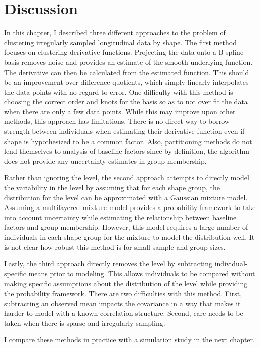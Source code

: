 \section{Discussion}
In this chapter, I described three different approaches to the problem of clustering irregularly sampled longitudinal data by shape. The first method focuses on clustering derivative functions. Projecting the data onto a B-spline basis removes noise and provides an estimate of the smooth underlying function. The derivative can then be calculated from the estimated function. This should be an improvement over difference quotients, which simply linearly interpolates the data points with no regard to error. One difficulty with this method is choosing the correct order and knots for the basis so as to not over fit the data when there are only a few data points. While this may improve upon other methods, this approach has limitations. There is no direct way to borrow strength between individuals when estimating their derivative function even if shape is hypothesized to be a common factor. Also, partitioning methods do not lend themselves to analysis of baseline factors since by definition, the algorithm does not provide any uncertainty estimates in group membership.  

Rather than ignoring the level, the second approach attempts to directly model the variability in the level by assuming that for each shape group, the distribution for the level can be approximated with a Gaussian mixture model. Assuming a multilayered mixture model provides a probability framework to take into account uncertainty while estimating the relationship between baseline factors and group membership. However, this model requires a large number of individuals in each shape group for the mixture to model the distribution well. It is not clear how robust this method is for small sample and group sizes.

Lastly, the third approach directly removes the level by subtracting individual-specific means prior to modeling. This allows individuals to be compared without making specific assumptions about the distribution of the level while providing the probability framework.  There are two difficulties with this method. First, subtracting an observed mean impacts the covariance in a way that makes it harder to model with a known correlation structure. Second, care needs to be taken when there is sparse and irregularly sampling. 

I compare these methods in practice with a simulation study in the next chapter.
